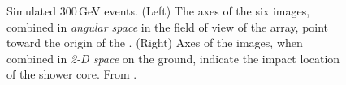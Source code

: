 \begin{figure}[ht]
\hspace*{\fill}%
\hspace*{\fill}
\caption{\label{FIG::VERITAS::SIMEVENT} 
Simulated 300\,GeV \Gray events. (Left) The axes of the six images,
combined in \textit{angular space} in the field of view of the array,
point toward the origin of the \Grayc. (Right) Axes of the images,
when combined in \textit{2-D space} on the ground, indicate the impact
location of the shower core. From
\citet{REF::VERITAS::1999PROPOSAL}.}
\end{figure}

